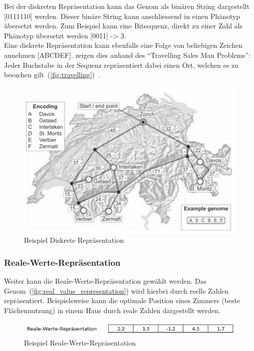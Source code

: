         Bei der diskreten Repräsentation kann das Genom als binären String dargestellt [0111110] werden.
        Dieser binäre String kann anschliessend in einen Phänotyp übersetzt werden.
        Zum Beispiel kann eine Bitsequenz, direkt zu einer Zahl als Phänotyp übersetzt werden [0011] -> 3.
        \\
        Eine diskrete Repräsentation kann ebenfalls eine Folge von beliebigen Zeichen annehmen [ABCDEF].
        \citet{book:bioInspired} zeigen dies anhand des ``Travelling Sales Man Problems'':
        Jeder Buchstabe in der Sequenz repräsentiert dabei einen Ort,
        welchen es zu besuchen gilt~(\vref{fig:travelling})~\cite[S.18]{book:bioInspired}.

        \begin{figure}[H]
          \includegraphics[scale=0.9,center]{graphics/discret_representation}
          \caption[\protect{}, S.18]{Beispiel Diskrete Repräsentation\label{fig:travelling}}
        \end{figure}

      \subsubsection{Reale-Werte-Repräsentation\label{subsub:GeneticRepresentationReal}}

        Weiter kann die Reale-Werte-Repräsentation gewählt werden.
        Das Genom~(\vref{fig:real_value_representation}) wird hierbei durch reelle Zahlen repräsentiert.
        Beispielsweise kann die optimale Position eines Zimmers (beste Flächennutzung) in einem Haus
        durch reale Zahlen dargestellt werden.

        \begin{figure}[H]
          \includegraphics[scale=1]{graphics/real_value_representation}
          \caption{Beispiel Reale-Werte-Repräsentation\label{fig:real_value_representation}}
        \end{figure}

